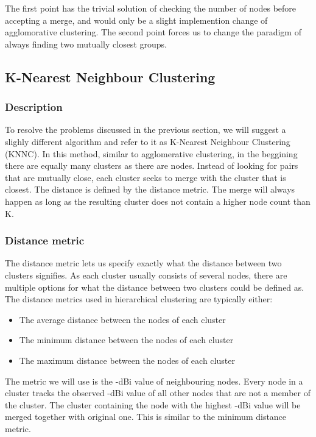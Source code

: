 The first point has the trivial solution of checking the number of nodes before accepting a merge,  and would only be a slight implemention change of agglomorative clustering. 
The second point forces us to change the paradigm of always finding two mutually closest groups. 

\subsection{K-Nearest Neighbour Clustering}
\subsubsection{Description}
To resolve the problems discussed in the previous section, we will suggest a slighly different algorithm and refer to it as K-Nearest Neighbour Clustering (KNNC). 
In this method, similar to agglomerative clustering, in the beggining there are equally many clusters as there are nodes. Instead of looking for pairs that are mutually close,
each cluster seeks to merge with the cluster that is closest. The distance is defined by the distance metric. The merge will always happen as long as the resulting cluster does 
not contain a higher node count than K.

\subsubsection{Distance metric}
The distance metric lets us specify exactly what the distance between two clusters signifies. As each cluster usually consists of several nodes, there are multiple
options for what the distance between two clusters could be defined as. The distance metrics used in hierarchical clustering are typically either:

\begin{itemize}
	\itemsep0em 
	\item The average distance between the nodes of each cluster
	\item The minimum distance between the nodes of each cluster
	\item The maximum distance between the nodes of each cluster
\end{itemize}

The metric we will use is the -dBi value of neighbouring nodes. Every node in a cluster tracks the observed -dBi value of all other nodes that are not a member of the cluster.
The cluster containing the node with the highest -dBi value will be merged together with original one. This is similar to the minimum distance metric. 

